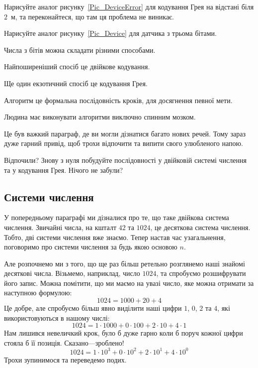 \documentclass{book}
\begin{document}
\begin{exercise}
Нарисуйте аналог рисунку~\ref{Pic_DeviceError} для кодування Грея на відстані біля $2$~м, та переконайтеся, що там ця проблема не виникає.
\end{exercise}

\begin{exercise}
Нарисуйте аналог рисунку~\ref{Pic_Device} для датчика з трьома бітами.
\end{exercise}

\begin{summary}
\item Числа з бітів можна складати різними способами.
\item Найпоширеніший спосіб це двійкове кодування.
\item Ще один екзотичний спосіб це кодування Грея.
\item Алгоритм це формальна послідовність кроків, для досягнення певної мети.
\item Людина має виконувати алгоритми виключно спинним мозком.
\end{summary}

\begin{exercise}
Це був важкий параграф, де ви могли дізнатися багато нових речей. Тому зараз дуже гарний привід, щоб трохи відпочити та випити свого улюбленого напою.
\end{exercise}

\begin{exercise}
Відпочили? Знову з нуля побудуйте послідовності у двійковій системі числення та у кодування Грея. Нічого не забули?
\end{exercise}

\subsection{Системи числення}

У попередньому параграфі ми дізналися про те, що таке двійкова система числення.
Звичайні числа, на кшталт $42$ та $1024$, це десяткова система числення.
Тобто, дві системи числення вже знаємо.
Тепер настав час узагальнення, поговоримо про системи числення за будь якою основою $n$.

Але розпочнемо ми з того, що ще раз більш ретельно розглянемо наші знайомі десяткові числа.
Візьмемо, наприклад, число $1024$, та спробуємо розшифрувати його запис.
Можна помітити, що ми маємо на увазі число, яке можна отримати за наступною формулою:
$$ 1024 = 1000 + 20 + 4 $$
Це добре, але спробуємо більш явно виділити наші цифри $1$, $0$, $2$ та $4$, які використовуються в нашому числі:
$$ 1024 = 1 \cdot 1000 + 0 \cdot 100 + 2 \cdot 10 + 4 \cdot 1 $$
Нам лишився невеличкий крок, було б дуже гарно коли б поруч кожної цифри стояла б її позиція.
Сказано---зроблено!
$$ 1024 = 1 \cdot 10^3 + 0 \cdot 10^2 + 2 \cdot 10^1 + 4 \cdot 10^0 $$
Трохи зупинимося та переведемо подих.
\end{document}
